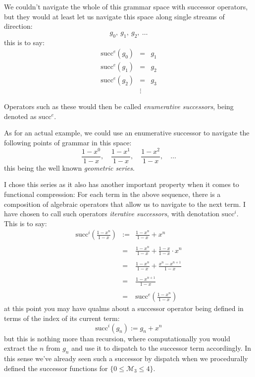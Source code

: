 \documentclass[twoside]{article}
\begin{document}
We couldn't navigate the whole of this grammar space with successor operators,
but they would at least let us navigate this space along single streams of direction:
$$ g_0,\ g_1,\ g_2,\ \ldots $$
this is to say:
$$ \begin{array}{rcl}
\mbox{succ}^e(g_0) & = & g_1	\\
\mbox{succ}^e(g_1) & = & g_2	\\
\mbox{succ}^e(g_2) & = & g_3	\\
 & \vdots &
\end{array} $$

\noindent Operators such as these would then be called \emph{enumerative successors}, being denoted as $ \mbox{succ}^e $.

As for an actual example, we could use an enumerative successor to navigate the following points of grammar in this space:
$$ \frac{1-x^0}{1-x},\quad\frac{1-x^1}{1-x},\quad\frac{1-x^2}{1-x},\quad\ldots $$
this being the well known \emph{geometric series}.

I chose this series as it also has another important property when it comes to functional compression: For each term in the
above sequence, there is a composition of algebraic operators that allow us to navigate to the next term. I have chosen to
call such operators \emph{iterative successors}, with denotation $ \mbox{succ}^i $. This is to say:
$$ \begin{array}{rcl}
\mbox{succ}^i\left(\frac{1-x^n}{1-x}\right)	& :=& \frac{1-x^n}{1-x} + x^n				\\
													\\
						& = & \frac{1-x^n}{1-x} + \frac{1-x}{1-x}\cdot x^n	\\
													\\
						& = & \frac{1-x^n}{1-x} + \frac{x^n-x^{n+1}}{1-x}	\\
													\\
						& = & \frac{1-x^{n+1}}{1-x}				\\
													\\
						& = & \mbox{succ}^e\left(\frac{1-x^n}{1-x}\right)
\end{array} $$
at this point you may have qualms about a successor operator being defined in terms of the index of its current term:
$$ \mbox{succ}^i(g_n) := g_n + x^n $$
but this is nothing more than recursion, where computationally you would extract the $ n $ from $ g_n $ and use it
to dispatch to the successor term accordingly. In this sense we've already seen such a successor by dispatch when
we procedurally defined the successor functions for $ \{0\le\mathcal{M}_3\le 4\} $.
\end{document}
